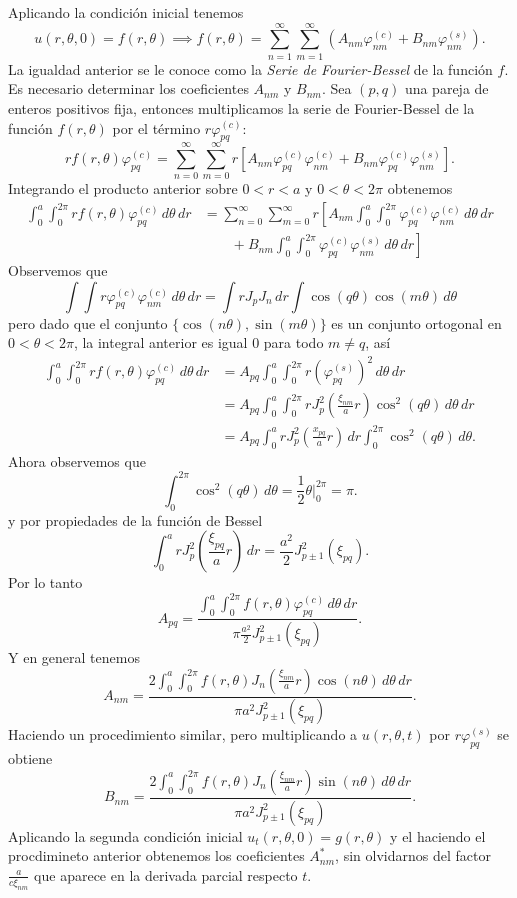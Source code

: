 \documentclass[11pt,letterpaper,draft]{report}
\theoremstyle{plain}
\theoremstyle{definition}
\theoremstyle{remark}
\newcommand\<{\langle}
\renewcommand\>{\rangle}
\renewcommand\phi\varphi
\begin{document}
Aplicando la condición inicial tenemos
\[
  u(r,\theta,0) = f(r,\theta)
  \implies
  f(r,\theta) = \sum_{n=1}^\infty\sum_{m=1}^\infty
            \left(
            A_{nm}\phi_{nm}^{(c)}
            + B_{nm}\phi_{nm}^{(s)}
            \right).
\] La igualdad anterior se le conoce como la \textit{Serie de Fourier-Bessel}
de la función $f$. Es necesario determinar los coeficientes $A_{nm}$
y $B_{nm}$. Sea $(p,q)$ una pareja de enteros positivos fija, 
entonces multiplicamos la serie de Fourier-Bessel de la función 
$f(r,\theta)$ por el término $r\phi_{pq}^{(c)}$:
\[
  rf(r,\theta)\phi_{pq}^{(c)} =
  \sum_{n=0}^\infty\sum_{m=0}^\infty
  r\left[
  A_{nm}\phi_{pq}^{(c)}\phi_{nm}^{(c)}
  + B_{nm}\phi_{pq}^{(c)}\phi_{nm}^{(s)}
  \right].
\] Integrando el producto anterior sobre $0 < r < a$ y $0 < \theta < 2\pi$ obtenemos
\begin{align*}
  \int_{0}^{a} \int_{0}^{2\pi} rf(r,\theta)\phi_{pq}^{(c)} \, d\theta \, dr &= 
  \sum_{n=0}^\infty\sum_{m=0}^\infty
  r \left[
    A_{nm} \int_{0}^{a} \int_{0}^{2\pi} \phi_{pq}^{(c)}\phi_{nm}^{(c)} \, d\theta \, dr \right.\\
  &\quad\quad + \left.
B_{nm} \int_{0}^{a} \int_{0}^{2\pi} \phi_{pq}^{(c)}\phi_{nm}^{(s)} \, d\theta \, dr\right]
\end{align*}
Observemos que
\[
  \int \int r\phi_{pq}^{(c)}\phi_{nm}^{(c)} \, d\theta \, dr = \int r J_p J_n \, dr \int \cos(q\theta)\cos(m\theta) \, d\theta
\] pero dado que el conjunto $\{\cos(n\theta), \sin(m\theta)\}$ es un conjunto ortogonal en $0 < \theta < 2\pi$, la integral anterior es igual 0 para todo $m \neq q$, así
\begin{align*}
  \int_{0}^{a} \int_{0}^{2\pi} rf(r,\theta)\phi_{pq}^{(c)} \, d\theta \, dr &=
  A_{pq} \int_{0}^{a} \int_{0}^{2\pi} r\left(\phi_{pq}^{(s)}\right)^2 \, d\theta \, dr\\
  &= A_{pq} \int_{0}^{a} \int_{0}^{2\pi} r J_p^2\left(\frac{\xi_{nm}}{a}r\right)\cos^2(q\theta) \, d\theta \, dr\\
  &= A_{pq} \int_{0}^{a} r J_p^2\left(\frac{x_{pq}}{a}r\right) \, dr \int_{0}^{2\pi} \cos^2(q\theta) \, d\theta.
\end{align*}
Ahora observemos que
\[
  \int_{0}^{2\pi} \cos^2(q\theta) \, d\theta = \frac{1}{2}\theta\bigg|_0^{2\pi} = \pi.
\] y por propiedades de la función de Bessel
\[
  \int_{0}^{a} r J_p^2\left(\frac{\xi_{pq}}{a}r\right) \, dr = \frac{a^2}{2} J_{p\pm1}^2\left(\xi_{pq}\right).
\] Por lo tanto
\[
  A_{pq} = \frac{\int_{0}^{a} \int_{0}^{2\pi} f(r,\theta)\phi_{pq}^{(c)} \, d\theta \, dr}{\pi \frac{a^2}{2} J_{p\pm1}^2(\xi_{pq})}.
\] Y en general tenemos
\[
  A_{nm} = \frac{2\int_{0}^{a} \int_{0}^{2\pi} f(r,\theta) J_n\left(\frac{\xi_{nm}}{a}r\right)\cos(n\theta) \, d\theta \, dr}{\pi a^2 J_{p\pm1}^2(\xi_{pq})}.
\] Haciendo un procedimiento similar, pero multiplicando a $u(r,\theta,t)$ por $r\phi_{pq}^{(s)}$ se obtiene
\[
  B_{nm} = \frac{2\int_{0}^{a} \int_{0}^{2\pi} f(r,\theta) J_n\left(\frac{\xi_{nm}}{a}r\right)\sin(n\theta) \, d\theta \, dr}{\pi a^2 J_{p\pm1}^2(\xi_{pq})}.
\] Aplicando la segunda condición inicial $u_t(r,\theta,0) = g(r,\theta)$ y el haciendo el procdimineto anterior obtenemos los coeficientes $A_{nm}^{\ast}$, sin olvidarnos del factor $\frac{a}{c\xi_{nm}}$ que aparece en la derivada parcial respecto $t$.
\end{document}
